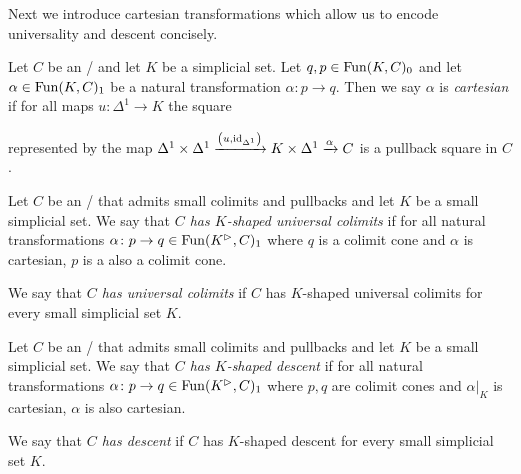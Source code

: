 Next we introduce cartesian transformations which allow us to encode universality and descent concisely.
\begin{definition}
    Let $C$ be an \inftycat/ and let $K$ be a simplicial set.
    Let $q,p\in\operatorname{Fun}(K,C)_0$ and let $\alpha\in\operatorname{Fun}(K,C)_1$ be a natural transformation $\alpha\colon p\to q$.
    Then we say $\alpha$ is \emph{cartesian} if for all maps $u\colon\Delta^1\to K$ the square 
    \begin{center}
    \end{center}
    represented by the map $\Delta^1\times\Delta^1\xrightarrow{\left(u,\text{id}_{\Delta^1}\right)}K\times\Delta^1\xrightarrow{\alpha}C$ is a pullback square in $C$. 
\end{definition}
\begin{definition}[Universality]
    Let $C$ be an \inftycat/ that admits small colimits and pullbacks and let $K$ be a small simplicial set.
    We say that \emph{$C$ has $K$-shaped universal colimits} if for all natural transformations $\alpha\colon p\to q\in\operatorname{Fun}(K^{\rhd},C)_1$ where $q$ is a colimit cone and $\alpha$ is cartesian, $p$ is a also a colimit cone.
    
    We say that \emph{$C$ has universal colimits} if $C$ has $K$-shaped universal colimits for every small simplicial set $K$.
\end{definition}
\begin{definition}[Descent]
    Let $C$ be an \inftycat/ that admits small colimits and pullbacks and let $K$ be a small simplicial set.
    We say that \emph{$C$ has $K$-shaped descent} if for all natural transformations $\alpha\colon p\to q\in\operatorname{Fun}(K^{\rhd},C)_1$ where $p,q$ are colimit cones and $\alpha|_K$ is cartesian, $\alpha$ is also cartesian.
    
    We say that \emph{$C$ has descent} if $C$ has $K$-shaped descent for every small simplicial set $K$.
\end{definition}
